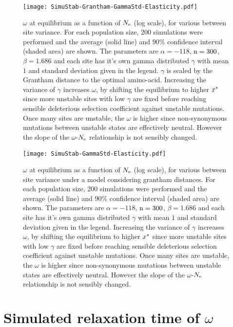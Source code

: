 \begin{figure}[H]
	\centering
	\texttt{[image: SimuStab-Grantham-GammaStd-Elasticity.pdf]}
	\caption[Effect of site variance on the susceptibility]{
	$\omega$ at equilibrium as a function of $N_{\mathrm{e}}$ (log scale), for various between site variance.
	For each population size, $200$ simulations were performed and the average (solid line) and $90\%$ confidence interval (shaded area) are shown.
	The parameters are $\alpha=-118$, $\text{n}=300$, $\beta=1.686$ and each site has it's own gamma distributed $\gamma$ with mean $1$ and standard deviation given in the legend. $\gamma$ is scaled by the Grantham distance to the optimal amino-acid.
	Increasing the variance of $\gamma$ increases $\omega$, by shifting the equilibrium to higher $x^{*}$ since more unstable sites with low $\gamma$ are fixed before reaching sensible deleterious selection coefficient against unstable mutations. Once many sites are unstable, the $\omega$ is higher since non-synonymous mutations between unstable states are effectively \gls{neutral}. However the slope of the $\omega$-$N_{\mathrm{e}}$ relationship is not sensibly changed.
	}
\end{figure}

\begin{figure}[H]
	\centering
	\texttt{[image: SimuStab-GammaStd-Elasticity.pdf]}
	\caption[Effect of site variance on the susceptibility without grantham distance]{
	$\omega$ at equilibrium as a function of $N_{\mathrm{e}}$ (log scale), for various between site variance under a model considering grantham distances.
	For each population size, $200$ simulations were performed and the average (solid line) and $90\%$ confidence interval (shaded area) are shown.
	The parameters are $\alpha=-118$, $\text{n}=300$, $\beta=1.686$ and each site has it's own gamma distributed $\gamma$ with mean $1$ and standard deviation given in the legend.
	Increasing the variance of $\gamma$ increases $\omega$, by shifting the equilibrium to higher $x^{*}$ since more unstable sites with low $\gamma$ are fixed before reaching sensible deleterious selection coefficient against unstable mutations. Once many sites are unstable, the $\omega$ is higher since non-synonymous mutations between unstable states are effectively \gls{neutral}. However the slope of the $\omega$-$N_{\mathrm{e}}$ relationship is not sensibly changed.
	}
\end{figure}

\section{Simulated relaxation time of \texorpdfstring{$\omega$}{ω}}

